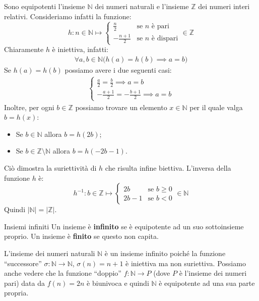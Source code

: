 \begin{example}
	Sono equipotenti l'insieme $\mathbb{N}$ dei numeri naturali e l'insieme $\mathbb{Z}$ dei numeri interi relativi. Consideriamo infatti la funzione:
	\begin{displaymath}
		h: n \in \mathbb{N} \mapsto \begin{cases}
			\frac{n}{2} & \text{se $n$ è pari} \\
			-\frac{n+1}{2} & \text{se $n$ è dispari}
		\end{cases}
		\in \mathbb{Z}
	\end{displaymath}
	Chiaramente $h$ è iniettiva, infatti:
	\begin{align*}
		\forall a,b \in \mathbb{N} \bigl(h(a)=h(b) \implies a=b\bigr)
	\end{align*}
	Se $h(a)=h(b)$ possiamo avere i due seguenti casi:
	\begin{align*}
		\begin{cases}
			\frac{a}{2} = \frac{b}{2} \implies a= b \\
			-\frac{a+1}{2} = -\frac{b+1}{2} \implies a=b
		\end{cases}
	\end{align*}
	Inoltre, per ogni $b \in \mathbb{Z}$ possiamo trovare un elemento $x \in \mathbb{N}$ per il quale valga $b=h(x)$:
	\begin{itemize}
		\item Se $b \in \mathbb{N}$ allora $b=h(2b)$;
		\item Se $b \in \mathbb{Z}\setminus \mathbb{N}$ allora $b=h(-2b-1)$.
	\end{itemize}
	Ciò dimostra la suriettività di $h$ che risulta infine biettiva. L'inversa della funzione $h$ è:
	\begin{displaymath}
		h^{-1}: b \in \mathbb{Z} \mapsto \begin{cases}
			2b & \text{se } b \geq 0 \\
			2b-1 & \text{se } b <0
		\end{cases} \in \mathbb{N}
	\end{displaymath}
	Quindi $|\mathbb{N}|=|\mathbb{Z}|$.
\end{example}

\begin{defbox}{Insiemi infiniti}
	Un insieme è \textbf{infinito} se è equipotente ad un suo sottoinsieme
	proprio. Un insieme è \textbf{finito} se questo non capita.
\end{defbox}

\begin{example}
	L'insieme dei numeri naturali $\mathbb{N}$ è un insieme infinito poiché la funzione ``successore'' $\sigma: \mathbb{N} \rightarrow \mathbb{N}$, $\sigma(n) = n+1$ è iniettiva ma non suriettiva. Possiamo anche vedere che la funzione ``doppio'' $f: \mathbb{N} \rightarrow P$ (dove $P$ è l'insieme dei numeri pari) data da $f(n)=2n$ è biunivoca e quindi $\mathbb{N}$ è equipotente ad una sua parte propria.
\end{example}

